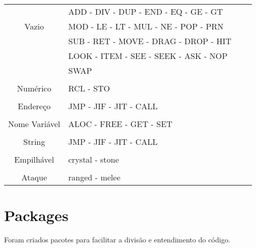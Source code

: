 \documentclass[a4paper]{article}
\begin{document}
    \begin{center}
      \begin{tabular}{|c|l|rc|}
                        &  ADD - DIV - DUP - END - EQ - GE - GT   \\
          Vazio         &  MOD - LE - LT - MUL - NE - POP - PRN   \\
                        &  SUB - RET - MOVE - DRAG - DROP - HIT   \\
                        &  LOOK - ITEM - SEE - SEEK - ASK - NOP   \\
                        &  SWAP                                   \\
                        &                                         \\
          Numérico      &  RCL - STO                              \\
          			    &                                         \\
          Endereço      &  JMP - JIF - JIT - CALL                 \\
          			    &                                         \\
          Nome Variável &  ALOC - FREE - GET - SET                \\
                        &                                         \\
          String        &  JMP - JIF - JIT - CALL                 \\
          			    &                                         \\
          Empilhável    &  crystal - stone                        \\
                        &                                         \\
          Ataque        &  ranged - melee                         \\
                        
      \end{tabular}
    \end{center}
    
\newpage %


\section{Packages}
	Foram criados pacotes para facilitar a divisão
	e entendimento do código.
	
\end{document}
